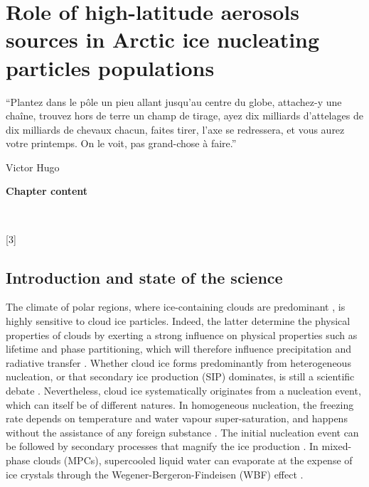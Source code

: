 \makeatother
\setcounter{counterchapter}{4}

\chapter{Role of high-latitude aerosols sources in Arctic ice nucleating particles populations}
\label{chap4}

\epigraph{``Plantez dans le pôle un pieu allant jusqu'au centre du globe, attachez-y une chaîne, trouvez hors de terre un champ de tirage, ayez dix milliards d'attelages de dix milliards de chevaux chacun, faites tirer, l'axe se redressera, et vous aurez votre printemps. On le voit, pas grand-chose à faire.''
}{Victor Hugo}


\newpage
\vspace*{\fill}
\begin{singlespace}
\textbf{Chapter content}

~

\startcontents[chapters]
[3]{}
\end{singlespace} 
\vspace*{\fill}
\newpage
 

\section{Introduction and state of the science}
\label{sec:intro_chap4}

 
The climate of polar regions, where ice-containing clouds are predominant \citep{matus_role_2017}, is highly sensitive to cloud ice particles.
Indeed, the latter determine the physical properties of clouds by exerting a strong influence on physical properties such as lifetime and phase partitioning, which will therefore influence precipitation and radiative transfer \citep{cantrell_production_2005}.
Whether cloud ice forms predominantly from heterogeneous nucleation, or that secondary ice production (SIP) dominates, is still a scientific debate \citep{zhao_primary_2022}.
Nevertheless, cloud ice systematically originates from a nucleation event, which can itself be of different natures.
In homogeneous nucleation, the freezing rate depends on temperature and water vapour super-saturation, and happens without the assistance of any foreign substance \citep{vali_technical_2015}. %
The initial nucleation event can be followed by secondary processes that magnify the ice production \citep{ickes_classical_2015}. 
In mixed-phase clouds (MPCs), supercooled liquid water can evaporate at the expense of ice crystals through the Wegener-Bergeron-Findeisen (WBF) effect \citep{korolev_limitations_2007}.

